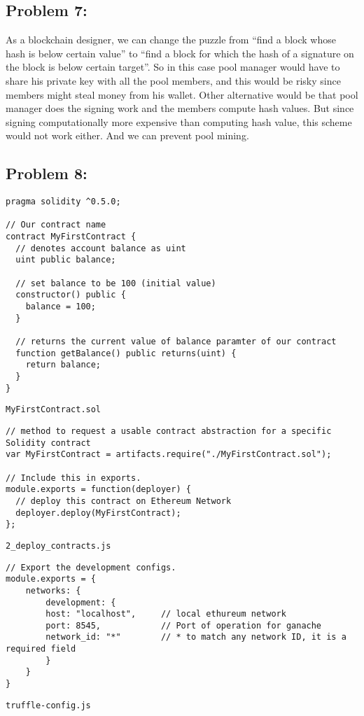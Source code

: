 \documentclass[a4paper]{article}
\begin{document}
\subsection*{Problem 7:}
As a blockchain designer, we can change the puzzle from ``find a block whose hash is below certain value'' to
``find a block for which the hash of a signature on the block is below certain target''. So in this case
pool manager would have to share his private key with all the pool members, and this would be risky
since members might steal money from his wallet. Other alternative would be that pool manager does the signing work
and the members compute hash values. But since signing computationally more expensive than computing hash value,
this scheme would not work either. And we can prevent pool mining.

\subsection*{Problem 8:}
\begin{lstlisting}[style=C++]
pragma solidity ^0.5.0;

// Our contract name
contract MyFirstContract {
  // denotes account balance as uint
  uint public balance;
  
  // set balance to be 100 (initial value)     
  constructor() public {
    balance = 100;
  }

  // returns the current value of balance paramter of our contract
  function getBalance() public returns(uint) {
    return balance;
  }
}
\end{lstlisting}
\texttt{MyFirstContract.sol} \\


\begin{lstlisting}[style=C++]
// method to request a usable contract abstraction for a specific Solidity contract
var MyFirstContract = artifacts.require("./MyFirstContract.sol");

// Include this in exports.
module.exports = function(deployer) {
  // deploy this contract on Ethereum Network
  deployer.deploy(MyFirstContract);
};
\end{lstlisting}
\texttt{2\_deploy\_contracts.js} \\


\begin{lstlisting}[style=C++]
// Export the development configs.
module.exports = {
    networks: {
        development: {
        host: "localhost",     // local ethureum network
        port: 8545,            // Port of operation for ganache
        network_id: "*"        // * to match any network ID, it is a required field
        }
    }
}
\end{lstlisting}
\texttt{truffle-config.js} \\
\end{document}
